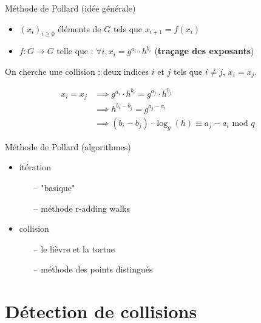 \documentclass{beamer}
\begin{document}
  \begin{frame}{Méthode de Pollard (idée générale)}
    \begin{itemize}
      \item $(x_i)_{i \ge 0}$ éléments de $G$ tels que $x_{i+1} = f(x_i)$
      \item $f: G \rightarrow G$ telle que : $\forall i, x_i = g^{a_i} \cdot h^{b_i}$ (\textbf{traçage des exposants})
    \end{itemize}


    On cherche une collision : deux indices $i$ et $j$ tels que $i \ne j$, $x_i = x_j$.

    \begin{align*}
      x_i = x_j &\implies g^{a_i} \cdot h^{b_i} = g^{a_j} \cdot h^{b_j} \\
                &\implies h^{b_i - b_j} = g^{a_j - a_i} \\
                &\implies (b_i - b_j) \cdot \log_g(h) \equiv a_j - a_i \text{\ mod } q
    \end{align*}
  \end{frame}


  \begin{frame}{Méthode de Pollard (algorithmes)}
    \begin{itemize}
      \item itération
        \begin{itemize}
          \item[--] "basique"
          \item[--] méthode r-adding walks
        \end{itemize}
      \item collision
        \begin{itemize}
          \item[--] le lièvre et la tortue
          \item[--] méthode des points distingués
        \end{itemize}
    \end{itemize}
  \end{frame}


  \section{Détection de collisions}
\end{document}
